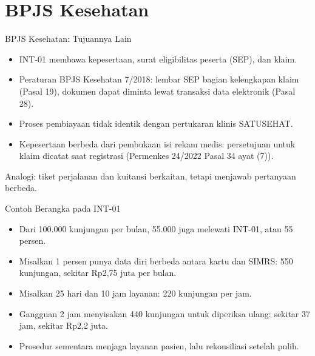 \documentclass[aspectratio=169, table, 12pt]{beamer}
\begin{document}
\section{BPJS Kesehatan}

\begin{frame}{{\Large BPJS Kesehatan: Tujuannya Lain}}
  \vspace{8pt}
  \begin{itemize}
    \item INT-01 membawa kepesertaan, surat eligibilitas peserta (SEP), dan klaim.
    \item Peraturan BPJS Kesehatan 7/2018: lembar SEP bagian kelengkapan klaim (Pasal 19), dokumen dapat diminta lewat transaksi data elektronik (Pasal 28).
    \item Proses pembiayaan tidak identik dengan pertukaran klinis SATUSEHAT.
    \item Kepesertaan berbeda dari pembukaan isi rekam medis: persetujuan untuk klaim dicatat saat registrasi (Permenkes 24/2022 Pasal 34 ayat (7)).
  \end{itemize}
  \vspace{4pt}
  {\small Analogi: tiket perjalanan dan kuitansi berkaitan, tetapi menjawab pertanyaan berbeda.}
\end{frame}

\begin{frame}{{\Large Contoh Berangka pada INT-01}}
  \vspace{8pt}
  \begin{itemize}
    \item Dari 100.000 kunjungan per bulan, 55.000 juga melewati INT-01, atau 55 persen.
    \item Misalkan 1 persen punya data diri berbeda antara kartu dan SIMRS: 550 kunjungan, sekitar Rp2,75 juta per bulan.
    \item Misalkan 25 hari dan 10 jam layanan: 220 kunjungan per jam.
    \item Gangguan 2 jam menyisakan 440 kunjungan untuk diperiksa ulang: sekitar 37 jam, sekitar Rp2,2 juta.
    \item Prosedur sementara menjaga layanan pasien, lalu rekonsiliasi setelah pulih.
  \end{itemize}
\end{frame}
\end{document}
